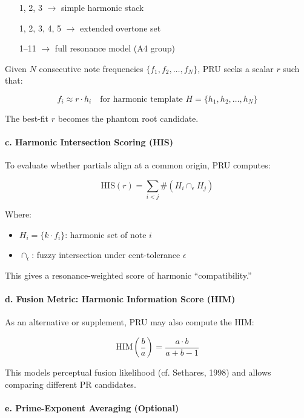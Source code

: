 \documentclass{article}
\begin{document}
\begin{itemize}
    \item [1, 2, 3] $\rightarrow$ simple harmonic stack
    \item [1, 2, 3, 4, 5] $\rightarrow$ extended overtone set
    \item [1–11] $\rightarrow$ full resonance model (A4 group)
\end{itemize}

Given $N$ consecutive note frequencies $\{f_1, f_2, \ldots, f_N\}$, PRU seeks a scalar $r$ such that:

\[
f_i \approx r \cdot h_i \quad \text{for harmonic template } H = \{h_1, h_2, \ldots, h_N\}
\]

The best-fit $r$ becomes the phantom root candidate.

\paragraph{c. Harmonic Intersection Scoring (HIS)}

To evaluate whether partials align at a common origin, PRU computes:

\[
\text{HIS}(r) = \sum_{i<j} \#(H_i \cap_\epsilon H_j)
\]

Where:

\begin{itemize}
    \item $H_i = \{k \cdot f_i\}$: harmonic set of note $i$
    \item $\cap_\epsilon$: fuzzy intersection under cent-tolerance $\epsilon$
\end{itemize}

This gives a resonance-weighted score of harmonic “compatibility.”

\paragraph{d. Fusion Metric: Harmonic Information Score (HIM)}

As an alternative or supplement, PRU may also compute the HIM:

\[
\text{HIM}\left(\frac{b}{a}\right) = \frac{a \cdot b}{a + b - 1}
\]

This models perceptual fusion likelihood (cf. Sethares, 1998) and allows comparing different PR candidates.

\paragraph{e. Prime-Exponent Averaging (Optional)}
\end{document}
